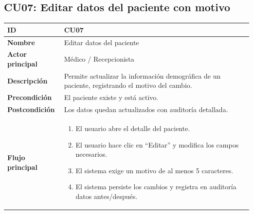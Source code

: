 \documentclass[11pt,a4paper]{article}
\begin{document}
\subsection*{CU07: Editar datos del paciente con motivo}
\begin{longtable}{|L{3.5cm}|L{10cm}|}
    \hline
    \textbf{ID}              & CU07                                                                                            \\ \hline
    \textbf{Nombre}          & Editar datos del paciente                                                                       \\ \hline
    \textbf{Actor principal} & Médico / Recepcionista                                                                          \\ \hline
    \textbf{Descripción}     & Permite actualizar la información demográfica de un paciente, registrando el motivo del cambio. \\ \hline
    \textbf{Precondición}    & El paciente existe y está activo.                                                               \\ \hline
    \textbf{Postcondición}   & Los datos quedan actualizados con auditoría detallada.                                          \\ \hline
    \textbf{Flujo principal} &
    \begin{enumerate}
        \item El usuario abre el detalle del paciente.
        \item El usuario hace clic en ``Editar'' y modifica los campos necesarios.
        \item El sistema exige un motivo de al menos 5 caracteres.
        \item El sistema persiste los cambios y registra en auditoría datos antes/después.
    \end{enumerate}                                      \\ \hline
\end{longtable}

\end{document}
